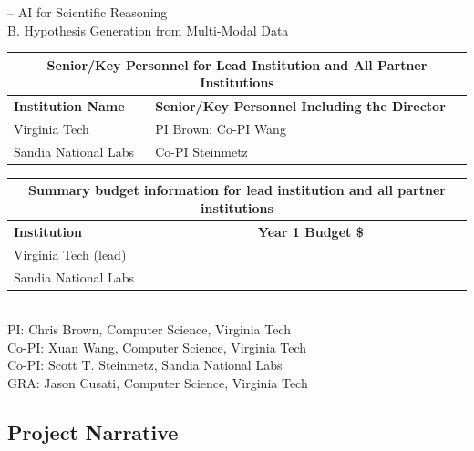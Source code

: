 \documentclass{files/proposalnsf}
\begin{document}
 -- AI for Scientific Reasoning \\
B. Hypothesis Generation from Multi-Modal Data \\

\begin{table}[h]
    \begin{tabular}{|l|l|}
    \hline
    \multicolumn{2}{|c|}{\textbf{Senior/Key Personnel for Lead Institution and All Partner Institutions}}  \\ \hline
        \textbf{Institution Name} & \textbf{Senior/Key Personnel Including the Director} \\ \hline
        Virginia Tech & PI Brown; Co-PI Wang \\ \hline
        Sandia National Labs & Co-PI Steinmetz \\ \hline
    \end{tabular}
    \label{tab:my_label}
\end{table}

\begin{table}[h]
    \begin{tabular}{|l|l|}
    \hline
    \multicolumn{2}{|c|}{\textbf{Summary budget information for lead institution and all partner institutions}}    \\ \hline
    \textbf{Institution} & \textbf{Year 1 Budget \$} \\ \hline
        Virginia Tech (lead) & \todo{} \\ \hline
        Sandia National Labs &  \todo{} \\ \hline
    \end{tabular}
    \label{tab:my_label}
\end{table}

\newpage
{}

\begin{center}
    \large{\proposalNineteen} \\ \vspace{0.5pt}
\footnotesize{PI: Chris Brown, Computer Science, Virginia Tech} \\
\footnotesize{Co-PI: Xuan Wang, Computer Science, Virginia Tech} \\
\footnotesize{Co-PI: Scott T. Steinmetz, Sandia National Labs} \\
\footnotesize{GRA: Jason Cusati, Computer Science, Virginia Tech}
\end{center}\vspace{-15pt}

\subsection*{Project Narrative}
\end{document}
